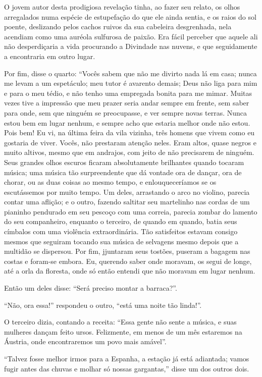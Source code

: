 O jovem autor desta prodigiosa revelação tinha, ao fazer seu relato, os
olhos arregalados numa espécie de estupefação do que ele ainda
sentia, e os raios do sol poente, deslizando pelos cachos ruivos da sua
cabeleira desgrenhada, nela acendiam como uma auréola sulfurosa de
paixão. Era fácil perceber que aquele ali não desperdiçaria a vida
procurando a Divindade nas nuvens, e que seguidamente a encontraria 
em outro lugar.

Por fim, disse o quarto: “Vocês sabem que não me divirto
nada lá em casa; nunca me levam a um espetáculo; meu tutor é avarento
demais; Deus não liga para mim e para o meu tédio, e não tenho uma
empregada bonita para me mimar. Muitas vezes tive a impressão que meu prazer
seria andar sempre em frente, sem saber para onde, sem que ninguém se
preocupasse, e ver sempre novas terras. Nunca estou bem em lugar
nenhum, e sempre acho que estaria melhor onde não estou. Pois bem! Eu
vi, na última feira da vila vizinha, três homens que vivem como eu
gostaria de viver. Vocês, não prestaram atenção neles. Eram
altos, quase negros e muito altivos, mesmo que em andrajos, com jeito
de não precisarem de ninguém. Seus grandes olhos escuros ficaram
absolutamente brilhantes quando tocaram música; uma música tão
surpreendente que dá vontade ora de dançar, ora de chorar, ou as duas
coisas ao mesmo tempo, e enlouqueceríamos se os escutássemos por muito
tempo. Um deles, arrastando o arco no violino, parecia contar uma
aflição; e o outro, fazendo saltitar seu martelinho nas cordas de um
pianinho pendurado em seu pescoço com uma correia, parecia zombar
do lamento do seu companheiro, enquanto o terceiro, de quando
em quando, batia seus címbalos com uma violência extraordinária. Tão
satisfeitos estavam consigo mesmos que seguiram tocando sua música de
selvagens mesmo depois que a multidão se dispersou. Por fim, jjuntaram
seus tostões, puseram a bagagem nas costas e foram-se embora. Eu,
querendo saber onde moravam, os segui de longe, até a orla da
floresta, onde só então entendi que não moravam em lugar nenhum.

Então um deles disse: “Será preciso montar a
barraca?''.

“Não, ora essa!'' respondeu o outro,
“está uma noite tão linda!''.

O terceiro dizia, contando a receita: “Essa gente não
sente a música, e suas mulheres dançam feito ursos. Felizmente, em menos
de um mês estaremos na Áustria, onde encontraremos um povo mais
amável''.

“Talvez fosse melhor irmos para a Espanha, a estação
já está adiantada; vamos fugir antes das chuvas e molhar só nossas
gargantas,'' disse um dos outros dois.

